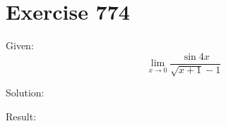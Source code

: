 \documentclass[a4paper, 10pt]{scrartcl}
\begin{document}
\section{Exercise 774}

Given:
\[
\lim_{x\to 0}{\frac{\sin{4x}}{\sqrt{x + 1} - 1}}
\]

Solution:

Result:
\end{document}
